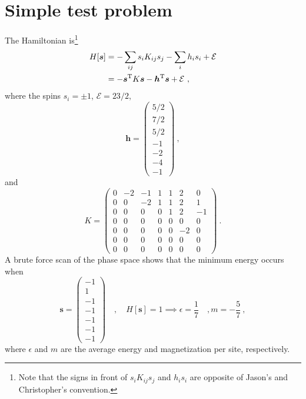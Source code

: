 \documentclass[11pt]{article}
\begin{document}
\section{Simple test problem}
The Hamiltonian is\footnote{Note that the signs in front of $s_iK_{ij}s_j$ and $h_is_i$ are opposite of Jason's and Christopher's convention.}  
\begin{align}
H[\bm s]&=-\sum_{ij}s_iK_{ij}s_j-\sum_ih_is_i+\mathcal{E}\label{eqn:H1}\\
&=-\bm s^{\rm T}K\bm s-\bm h^{\rm T}\bm s+\mathcal{E}\ ,
\end{align}
where the spins $s_i=\pm 1$, $\mathcal{E}=23/2$, 
\begin{equation}
\bm h = \begin{pmatrix}
5/2\\ 7/2\\ 5/2\\  -1\\  -2\\  -4 \\  -1
\end{pmatrix}\ ,
\end{equation} 
and
\begin{equation}\label{eqn:K}
K=
\begin{pmatrix}
 0&  -2&  -1& 1& 1& 2&  0\\
         0&  0&  -2& 1& 1& 2& 1	\\
         0&  0&  0&  0& 1& 2& -1\\
         0&  0&  0&  0&  0&  0&  0\\
         0&  0&  0&  0&  0&  -2&  0\\
         0&  0&  0&  0&  0&  0&  0\\
         0&  0&  0&  0&  0&  0&  0
        \end{pmatrix}\ .
        \end{equation}
A brute force scan of the phase space shows that the minimum energy occurs when
\begin{equation}
\bm s=\begin{pmatrix}
-1\\ 1\\ -1\\ -1\\ -1\\ -1\\ -1
\end{pmatrix}\quad,\quad H[\bm s]=1\implies \epsilon = \frac{1}{7}\quad, m = -\frac{5}{7}\ ,
\end{equation}
where $\epsilon$ and $m$ are the average energy and magnetization per site, respectively. 
\end{document}
